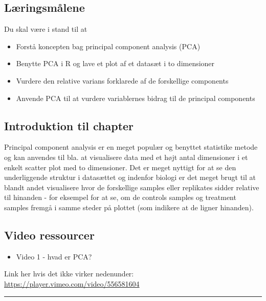 \documentclass[
]{book}
\providecommand{\tightlist}{%
  \setlength{\itemsep}{0pt}\setlength{\parskip}{0pt}}
\begin{document}
\hypertarget{luxe6ringsmuxe5lene-5}{%
\subsection{Læringsmålene}\label{luxe6ringsmuxe5lene-5}}

Du skal være i stand til at

\begin{itemize}
\tightlist
\item
  Forstå koncepten bag principal component analysis (PCA)
\item
  Benytte PCA i R og lave et plot af et datasæt i to dimensioner
\item
  Vurdere den relative varians forklarede af de forskellige components
\item
  Anvende PCA til at vurdere variablernes bidrag til de principal components
\end{itemize}

\hypertarget{introduktion-til-chapter-1}{%
\subsection{Introduktion til chapter}\label{introduktion-til-chapter-1}}

Principal component analysis er en meget populær og benyttet statistike metode og kan anvendes til bla. at visualisere data med et højt antal dimensioner i et enkelt scatter plot med to dimensioner. Det er meget nyttigt for at se den underliggende struktur i datasættet og indenfor biologi er det meget brugt til at blandt andet visualisere hvor de forskellige samples eller replikates sidder relative til hinanden - for eksempel for at se, om de controls samples og treatment samples fremgå i samme steder på plottet (som indikere at de ligner hinanden).

\hypertarget{video-ressourcer-6}{%
\subsection{Video ressourcer}\label{video-ressourcer-6}}

\begin{itemize}
\tightlist
\item
  Video 1 - hvad er PCA?
\end{itemize}

Link her hvis det ikke virker nedenunder: \url{https://player.vimeo.com/video/556581604}

\begin{center}\rule{0.5\linewidth}{0.5pt}\end{center}
\end{document}
